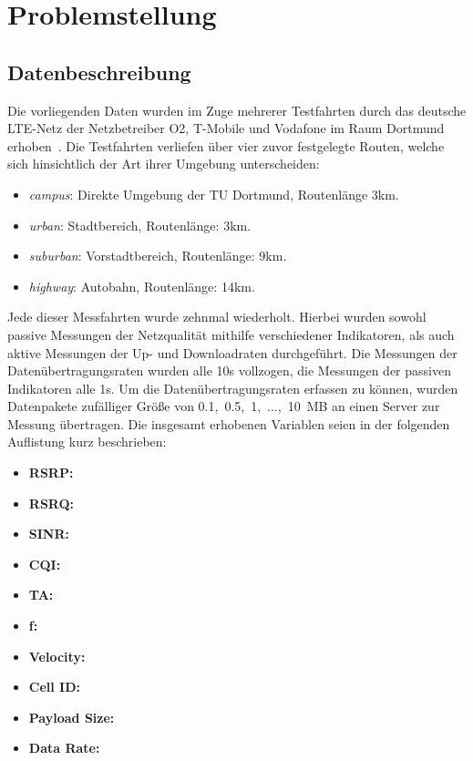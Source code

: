 \section{Problemstellung}

\subsection{Datenbeschreibung}

Die vorliegenden Daten wurden im Zuge mehrerer Testfahrten durch das deutsche LTE-Netz der Netzbetreiber O2,
T-Mobile und Vodafone im Raum Dortmund erhoben~\cite{IEEE}.
Die Testfahrten verliefen \"uber vier zuvor festgelegte Routen, welche sich hinsichtlich der Art ihrer Umgebung unterscheiden:
\begin{itemize}
    \item \textit{campus}: Direkte Umgebung der TU Dortmund, Routenl\"ange 3km.
    \item \textit{urban}: Stadtbereich, Routenl\"ange: 3km.
    \item \textit{suburban}: Vorstadtbereich, Routenl\"ange: 9km.
    \item \textit{highway}: Autobahn, Routenl\"ange: 14km.
\end{itemize}
Jede dieser Messfahrten wurde zehnmal wiederholt.
Hierbei wurden sowohl passive Messungen der Netzqualit\"at mithilfe verschiedener Indikatoren, als auch aktive
Messungen der Up- und Downloadraten durchgef\"uhrt.
Die Messungen der Da\-ten\-\"uber\-tra\-gungs\-ra\-ten wurden alle 10s vollzogen, die Messungen der passiven Indikatoren alle 1s.
Um die Da\-ten\-\"uber\-tra\-gungs\-ra\-ten erfassen zu k\"onnen,
wurden Datenpakete zuf\"alliger Gr\"o{\ss}e von \mbox{0.1, 0.5, 1, ..., 10 MB} an einen Server zur Messung \"ubertragen.
Die insgesamt erhobenen Variablen seien in der folgenden Auflistung kurz beschrieben:
\begin{itemize}
    \item \textbf{RSRP:}
    \item \textbf{RSRQ:}
    \item \textbf{SINR:}
    \item \textbf{CQI:}
    \item \textbf{TA:}
    \item \textbf{f:}
    \item \textbf{Velocity:}
    \item \textbf{Cell ID:}
    \item \textbf{Payload Size:}
    \item \textbf{Data Rate:}
\end{itemize}

